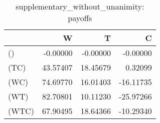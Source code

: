 \begin{table}
\centering
\caption{supplementary_without_unanimity: payoffs}
\begin{tabular}{lrrr}
\toprule
{} &        W &        T &         C \\
\midrule
()    & -0.00000 & -0.00000 &  -0.00000 \\
(TC)  & 43.57407 & 18.45679 &   0.32099 \\
(WC)  & 74.69770 & 16.01403 & -16.11735 \\
(WT)  & 82.70801 & 10.11230 & -25.97266 \\
(WTC) & 67.90495 & 18.64366 & -10.29340 \\
\bottomrule
\end{tabular}
\end{table}
